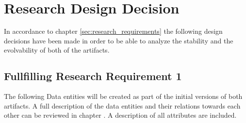 \section{Research Design Decision} \label{sec:research_design_decisions}

In accordance to chapter \ref{sec:research_requirements} the following design decisions
have been made in order to be able to analyze the stability and the evolvability of both
of the artifacts.

\subsection{Fullfilling Research Requirement 1}
The following Data entities will be created as part of the initial versions of both
artifacts. A full description of the data entities and their relations towards each other
can be reviewed in chapter . A description of all
attributes are included.

